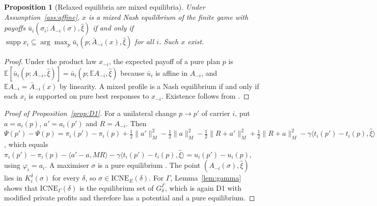 \documentclass[preprint,11pt]{elsarticle}
\newtheorem{proposition}[theorem]{Proposition}
\theoremstyle{definition}
\theoremstyle{remark}
\newcommand{\E}{\mathbb{E}}
\newcommand{\ub}{\bar u}
\newcommand{\Abar}{\bar A}
\newcommand{\supp}{\operatorname{supp}}
\newcommand{\ICNE}{\mathrm{ICNE}}
\newcommand{\ip}[2]{\langle #1,#2\rangle}
\begin{document}
\begin{proposition}[Relaxed equilibria are mixed equilibria]\label{prop:relaxed}
Under Assumption~\ref{ass:affine}, $x$ is a mixed Nash equilibrium of the finite game with payoffs $\ub_i(\sigma_i;A_{-i}(\sigma),\hat\xi)$ if and only if $\supp x_i\subseteq\arg\max_p\ub_i(p;\Abar_{-i}(x),\hat\xi)$ for all $i$. Such $x$ exist.
\end{proposition}
\begin{proof}
Under the product law $x_{-i}$, the expected payoff of a pure plan $p$ is $\E[\ub_i(p;A_{-i},\hat\xi)]=\ub_i(p;\E A_{-i},\hat\xi)$ because $\ub_i$ is affine in $A_{-i}$, and $\E A_{-i}=\Abar_{-i}(x)$ by linearity. A mixed profile is a Nash equilibrium if and only if each $x_i$ is supported on pure best responses to $x_{-i}$. Existence follows from \citet{Nash1951}.
\end{proof}

\begin{proof}[Proof of Proposition~\ref{prop:D1}]
For a unilateral change $p\to p'$ of carrier $i$, put $a=a_i(p)$, $a'=a_i(p')$ and $R=A_{-i}$. Then $\Psi(p')-\Psi(p)=\pi_i(p')-\pi_i(p)+\tfrac12\|a'\|_M^2-\tfrac12\|a\|^2_M-\tfrac12\|R+a'\|_M^2+\tfrac12\|R+a\|_M^2-\gamma\ip{t_i(p')-t_i(p)}{\hat\xi}$, which equals $\pi_i(p')-\pi_i(p)-\ip{a'-a}{MR}-\gamma\ip{t_i(p')-t_i(p)}{\hat\xi}=u_i(p')-u_i(p)$, using $\varphi_i=a_i$. A maximiser $\sigma$ is a pure equilibrium \citep{Monderer1996}. The point $(A_{-i}(\sigma),\hat\xi)$ lies in $K_i^\delta(\sigma)$ for every $\delta$, so $\sigma\in\ICNE_E(\delta)$. For $\Gamma$, Lemma~\ref{lem:gamma} shows that $\ICNE_\Gamma(\delta)$ is the equilibrium set of $G^\Gamma_\delta$, which is again D1 with modified private profits and therefore has a potential and a pure equilibrium.
\end{proof}
\end{document}
